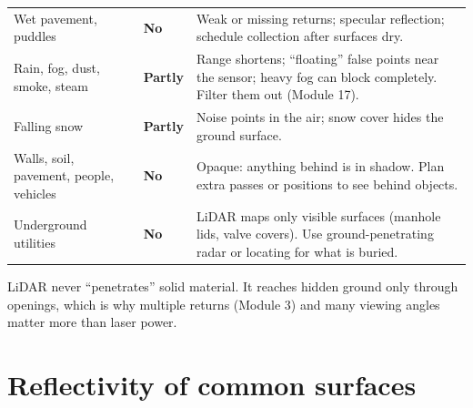 \begin{center}
\begin{tabularx}{\linewidth}{>{\raggedright\arraybackslash}p{3.0cm}>{\raggedright\arraybackslash}p{2.2cm}X}
Wet pavement, puddles & \textbf{No} & Weak or missing returns; specular reflection; schedule collection after surfaces dry.\\
Rain, fog, dust, smoke, steam & \textbf{Partly} & Range shortens; ``floating'' false points near the sensor; heavy fog can block completely. Filter them out (Module 17).\\
Falling snow & \textbf{Partly} & Noise points in the air; snow cover hides the ground surface.\\
Walls, soil, pavement, people, vehicles & \textbf{No} & Opaque: anything behind is in shadow. Plan extra passes or positions to see behind objects.\\
Underground utilities & \textbf{No} & LiDAR maps only visible surfaces (manhole lids, valve covers). Use ground-penetrating radar or locating for what is buried.\\\bottomrule
\end{tabularx}\end{center}

\begin{bigidea}
LiDAR never ``penetrates'' solid material. It reaches hidden ground only through openings, which is why multiple returns (Module 3) and many viewing angles matter more than laser power.
\end{bigidea}

\section{Reflectivity of common surfaces}

